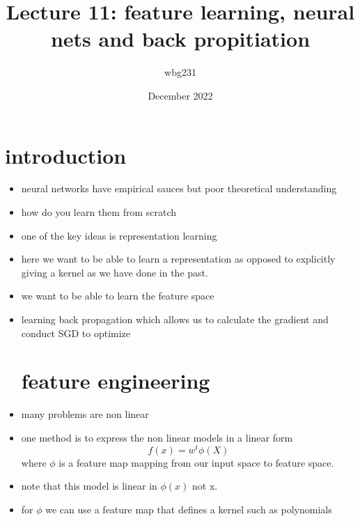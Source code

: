 \documentclass{article}
\title{Lecture 11: feature learning, neural nets and back propitiation}
\author{wbg231 }
\date{December 2022}
\begin{document}
\maketitle

\section*{introduction}
\begin{itemize}
\item neural networks have empirical sauces but poor theoretical understanding 
\item how do you learn them from scratch 
\item one of the key ideas is representation learning 
\item here we want to be able to learn a representation as opposed to explicitly giving a kernel as we have done in the past. 
\item we want to be able to learn the feature space
\item learning back propagation which allows us to calculate the gradient and conduct SGD to optimize
\section{feature engineering}
\item many problems are non linear 
\item one method is to express the non linear models in a linear form $$f(x)=w^t\phi(X)$$ where $\phi$ is a feature map mapping from our input space to feature space. 
\item note that this model is linear in $\phi(x)$ not x. 
\item for $\phi$ we can use a feature map that defines a kernel such as polynomials 

\end{itemize}
\end{document}
